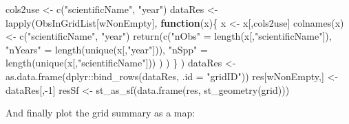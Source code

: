 \documentclass[
  10pt,
]{article}
\newenvironment{Shaded}{\begin{snugshade}}{\end{snugshade}}
\newcommand{\AttributeTok}[1]{\textcolor[rgb]{0.77,0.63,0.00}{#1}}
\newcommand{\ControlFlowTok}[1]{\textcolor[rgb]{0.13,0.29,0.53}{\textbf{#1}}}
\newcommand{\DecValTok}[1]{\textcolor[rgb]{0.00,0.00,0.81}{#1}}
\newcommand{\FunctionTok}[1]{\textcolor[rgb]{0.00,0.00,0.00}{#1}}
\newcommand{\NormalTok}[1]{#1}
\newcommand{\OtherTok}[1]{\textcolor[rgb]{0.56,0.35,0.01}{#1}}
\newcommand{\SpecialCharTok}[1]{\textcolor[rgb]{0.00,0.00,0.00}{#1}}
\newcommand{\StringTok}[1]{\textcolor[rgb]{0.31,0.60,0.02}{#1}}
\begin{document}
\begin{Shaded}
\begin{Highlighting}[]
\NormalTok{cols2use }\OtherTok{\textless{}{-}} \FunctionTok{c}\NormalTok{(}\StringTok{"scientificName"}\NormalTok{, }\StringTok{"year"}\NormalTok{)}
\NormalTok{dataRes }\OtherTok{\textless{}{-}} \FunctionTok{lapply}\NormalTok{(ObsInGridList[wNonEmpty], }
                  \ControlFlowTok{function}\NormalTok{(x)\{}
\NormalTok{                    x }\OtherTok{\textless{}{-}}\NormalTok{ x[,cols2use]}
                    \FunctionTok{colnames}\NormalTok{(x) }\OtherTok{\textless{}{-}} \FunctionTok{c}\NormalTok{(}\StringTok{"scientificName"}\NormalTok{, }\StringTok{"year"}\NormalTok{)}
                    \FunctionTok{return}\NormalTok{(}\FunctionTok{c}\NormalTok{(}\StringTok{"nObs"} \OtherTok{=} \FunctionTok{length}\NormalTok{(x[,}\StringTok{"scientificName"}\NormalTok{]),}
                             \StringTok{"nYears"} \OtherTok{=} \FunctionTok{length}\NormalTok{(}\FunctionTok{unique}\NormalTok{(x[,}\StringTok{"year"}\NormalTok{])),}
                             \StringTok{"nSpp"} \OtherTok{=} \FunctionTok{length}\NormalTok{(}\FunctionTok{unique}\NormalTok{(x[,}\StringTok{"scientificName"}\NormalTok{]))}
\NormalTok{                             )}
\NormalTok{                           )}
\NormalTok{                    \}}
\NormalTok{                  )}
\NormalTok{dataRes }\OtherTok{\textless{}{-}} \FunctionTok{as.data.frame}\NormalTok{(dplyr}\SpecialCharTok{::}\FunctionTok{bind\_rows}\NormalTok{(dataRes, }\AttributeTok{.id =} \StringTok{"gridID"}\NormalTok{))}
\NormalTok{res[wNonEmpty,] }\OtherTok{\textless{}{-}}\NormalTok{ dataRes[,}\SpecialCharTok{{-}}\DecValTok{1}\NormalTok{]}
\NormalTok{resSf }\OtherTok{\textless{}{-}} \FunctionTok{st\_as\_sf}\NormalTok{(}\FunctionTok{data.frame}\NormalTok{(res, }\FunctionTok{st\_geometry}\NormalTok{(grid)))}
\end{Highlighting}
\end{Shaded}

And finally plot the grid summary as a map:
\end{document}

